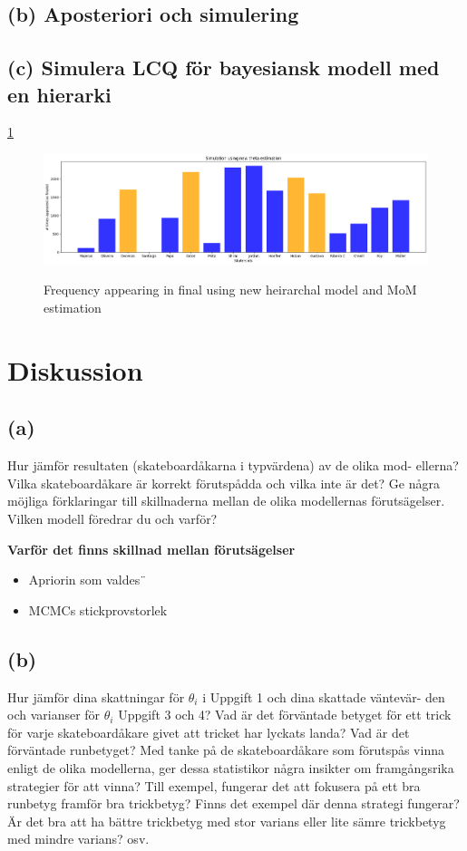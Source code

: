 \documentclass{assignment}
\begin{document}
\subsection*{(b) Aposteriori och simulering}

\subsection*{(c) Simulera LCQ för bayesiansk modell med en hierarki}
\cref{new theta lcq}
\begin{figure}
    \includegraphics[width = 180mm]{assets/new_theta_LCQ.png}
    \label{new theta lcq}
    \caption{Frequency appearing in final using new heirarchal model and MoM estimation}
\end{figure}
\section{Diskussion}
\subsection*{(a)} Hur jämför resultaten (skateboardåkarna i typvärdena) av de olika mod-
ellerna? Vilka skateboardåkare är korrekt förutspådda och vilka inte är det?
Ge några möjliga förklaringar till skillnaderna mellan de olika modellernas
förutsägelser. Vilken modell föredrar du och varför?

\textbf{Varför det finns skillnad mellan förutsägelser}
\begin{itemize}
    \item Apriorin som valdes¨
    \item MCMCs stickprovstorlek
\end{itemize}

\subsection*{(b)}
Hur jämför dina skattningar för $\theta_i$ i Uppgift 1 och dina skattade väntevär-
den och varianser för $\theta_i$ Uppgift 3 och 4? Vad är det förväntade betyget
för ett trick för varje skateboardåkare givet att tricket har lyckats landa?
Vad är det förväntade runbetyget? Med tanke på de skateboardåkare som
förutspås vinna enligt de olika modellerna, ger dessa statistikor några insikter
om framgångsrika strategier för att vinna? Till exempel, fungerar det att
fokusera på ett bra runbetyg framför bra trickbetyg? Finns det exempel där
denna strategi fungerar? Är det bra att ha bättre trickbetyg med stor varians
eller lite sämre trickbetyg med mindre varians? osv.
\end{document}
